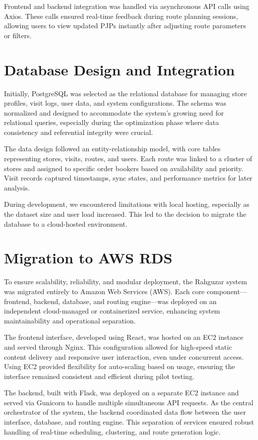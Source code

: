 Frontend and backend integration was handled via asynchronous API calls using Axios. These calls ensured real-time feedback during route planning sessions, allowing users to view updated PJPs instantly after adjusting route parameters or filters.

\section{Database Design and Integration}
Initially, PostgreSQL was selected as the relational database for managing store profiles, visit logs, user data, and system configurations. The schema was normalized and designed to accommodate the system's growing need for relational queries, especially during the optimization phase where data consistency and referential integrity were crucial.

The data design followed an entity-relationship model, with core tables representing stores, visits, routes, and users. Each route was linked to a cluster of stores and assigned to specific order bookers based on availability and priority. Visit records captured timestamps, sync states, and performance metrics for later analysis.

During development, we encountered limitations with local hosting, especially as the dataset size and user load increased. This led to the decision to migrate the database to a cloud-hosted environment.

\section{Migration to AWS RDS}
To ensure scalability, reliability, and modular deployment, the Rahguzar system was migrated entirely to Amazon Web Services (AWS). Each core component—frontend, backend, database, and routing engine—was deployed on an independent cloud-managed or containerized service, enhancing system maintainability and operational separation.

The frontend interface, developed using React, was hosted on an EC2 instance and served through Nginx. This configuration allowed for high-speed static content delivery and responsive user interaction, even under concurrent access. Using EC2 provided flexibility for auto-scaling based on usage, ensuring the interface remained consistent and efficient during pilot testing.

The backend, built with Flask, was deployed on a separate EC2 instance and served via Gunicorn to handle multiple simultaneous API requests. As the central orchestrator of the system, the backend coordinated data flow between the user interface, database, and routing engine. This separation of services ensured robust handling of real-time scheduling, clustering, and route generation logic.

